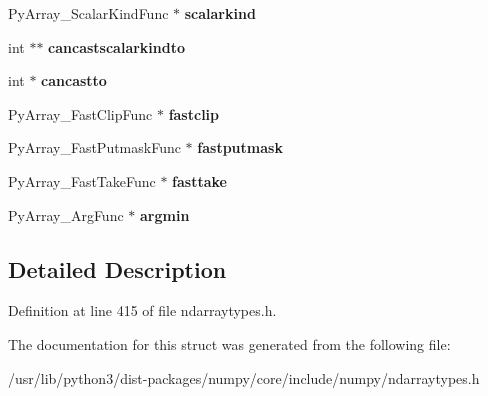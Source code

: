 \begin{DoxyCompactItemize}
\item 
Py\+Array\+\_\+\+Scalar\+Kind\+Func $\ast$ {\bfseries scalarkind}\hypertarget{structPyArray__ArrFuncs_a9b882211de70deb243f635787a7a31f4}{}\label{structPyArray__ArrFuncs_a9b882211de70deb243f635787a7a31f4}

\item 
int $\ast$$\ast$ {\bfseries cancastscalarkindto}\hypertarget{structPyArray__ArrFuncs_a62f0f9a7951e4353666b8a68043a9e71}{}\label{structPyArray__ArrFuncs_a62f0f9a7951e4353666b8a68043a9e71}

\item 
int $\ast$ {\bfseries cancastto}\hypertarget{structPyArray__ArrFuncs_a5a8f1855100d1e1f9cd39246f34516e0}{}\label{structPyArray__ArrFuncs_a5a8f1855100d1e1f9cd39246f34516e0}

\item 
Py\+Array\+\_\+\+Fast\+Clip\+Func $\ast$ {\bfseries fastclip}\hypertarget{structPyArray__ArrFuncs_a44c2edd440ac3bdeabe3fa7dde7476e4}{}\label{structPyArray__ArrFuncs_a44c2edd440ac3bdeabe3fa7dde7476e4}

\item 
Py\+Array\+\_\+\+Fast\+Putmask\+Func $\ast$ {\bfseries fastputmask}\hypertarget{structPyArray__ArrFuncs_af0ae006c484708ad98eb1d0870b51e38}{}\label{structPyArray__ArrFuncs_af0ae006c484708ad98eb1d0870b51e38}

\item 
Py\+Array\+\_\+\+Fast\+Take\+Func $\ast$ {\bfseries fasttake}\hypertarget{structPyArray__ArrFuncs_a03c7377b86599da184c12b4f7c5628fd}{}\label{structPyArray__ArrFuncs_a03c7377b86599da184c12b4f7c5628fd}

\item 
Py\+Array\+\_\+\+Arg\+Func $\ast$ {\bfseries argmin}\hypertarget{structPyArray__ArrFuncs_a90344826ff8fc714bb3a4b05126bddf5}{}\label{structPyArray__ArrFuncs_a90344826ff8fc714bb3a4b05126bddf5}

\end{DoxyCompactItemize}


\subsection{Detailed Description}


Definition at line 415 of file ndarraytypes.\+h.



The documentation for this struct was generated from the following file\+:\begin{DoxyCompactItemize}
\item 
/usr/lib/python3/dist-\/packages/numpy/core/include/numpy/ndarraytypes.\+h\end{DoxyCompactItemize}
